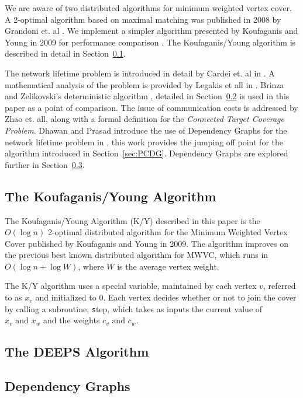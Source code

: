 We are aware of two distributed algorithms for minimum weighted vertex cover. A 2-optimal algorithm based on maximal matching was published in 2008 by Grandoni et. al \cite{1435381}. We implement a simpler algorithm presented by Koufaganis and Young in 2009 for performance comparison \cite{1582746}. The Koufaganis/Young algorithm is described in detail in Section~\ref{sec:k-y-alg}.

The network lifetime problem is introduced in detail by Cardei et. al in \cite{1498475}. A mathematical analysis of the problem is provided by Legakis et all in \cite{4697802}. Brinza and Zelikovski's deterministic algorithm \cite{1640702}, detailed in Section~\ref{sec:deeps} is used in this paper as a point of comparison. The issue of communication costs is addressed by Zhao et. all, along with a formal definition for the {\em Connected Target Coverage Problem}\cite{1514028}. Dhawan and Prasad introduce the use of Dependency Graphs for the network lifetime problem in \cite{978-3-540-77220-0_36}, this work provides the jumping off point for the algorithm introduced in Section~\ref{sec:PCDG}. Dependency Graphs are explored further in Section~\ref{sec:dep-graphs}.

\subsection{The Koufaganis/Young Algorithm}
\label{sec:k-y-alg}

The Koufaganis/Young Algorithm (K/Y) described in this paper is the $O(\log n)$ 2-optimal distributed algorithm for the Minimum Weighted Vertex Cover published by Koufaganis and Young in 2009\cite{1582746}. The algorithm improves on the previous best known distributed algorithm for MWVC, which runs in $O(\log n + \log W)$, where  $W$ is the average vertex weight\cite{1435381}.

The K/Y algorithm uses a special variable, maintained by each vertex $v$, referred to as $x_v$ and initialized to 0. Each vertex decides whether or not to join the cover by calling a subroutine, {\texttt step}, which takes as inputs the current value of $x_v \text{ and } x_w$ and the weights $c_v \text{ and } c_w$. 



\subsection{The DEEPS Algorithm}
\label{sec:deeps}


\subsection{Dependency Graphs}
\label{sec:dep-graphs}

